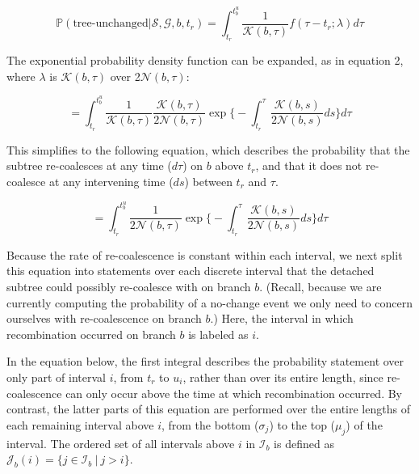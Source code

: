 \documentclass[11pt]{article}
\begin{document}
\begin{equation}
	\mathbb{P}(\textrm{tree-unchanged} | \mathcal{S}, \mathcal{G}, b, t_r) = 
	\int_{t_r}^{t_b^u} \frac{1}{\mathcal{K}(b,\tau)} f(\tau - t_r; \lambda) d\tau
\end{equation}

\noindent The exponential probability density function can be expanded, as in 
equation 2, where $\lambda$ is $\mathcal{K}(b,\tau)$ over 
2$\mathcal{N}(b,\tau)$:

\begin{equation}
	= \int_{t_r}^{t_b^u} 
	\frac{1}{\mathcal{K}(b,\tau)} 
	\frac{\mathcal{K}(b,\tau)}{2\mathcal{N}(b,\tau)}
	\exp \bigg\{
		-\int_{t_r}^{\tau} \frac{\mathcal{K}(b,s)}{2\mathcal{N}(b,s)}ds
		\bigg\} d\tau
\end{equation}

\noindent This simplifies to the following equation, which describes the probability that
the subtree re-coalesces at any time ($d\tau$) on $b$ above $t_r$, and 
that it does not re-coalesce at any intervening time ($ds$) between 
$t_r$ and $\tau$.

\begin{equation}
	= \int_{t_r}^{t_b^u}
	\frac{1}{2\mathcal{N}(b,\tau)}
	\exp \bigg\{
		-\int_{t_r}^{\tau} \frac{\mathcal{K}(b,s)}{2\mathcal{N}(b,s)}ds
		\bigg\} d\tau
\end{equation}

\noindent Because the rate of re-coalescence is constant within each interval, 
we next split this equation into statements over each discrete interval that the
detached subtree could possibly re-coalesce with on branch $b$. (Recall, because
we are currently computing the probability of a no-change event we only need
to concern ourselves with re-coalescence on branch $b$.)
Here, the interval in which recombination occurred on branch $b$ is labeled
as $i$. 

In the equation below, the first integral describes the probability statement
over only part of interval $i$, from $t_r$ to $u_i$, rather than over its entire 
length, since re-coalescence can only occur above the time at which recombination 
occurred. By contrast, the latter parts of this equation are performed over the
entire lengths of each remaining interval above $i$, from the 
bottom ($\sigma_j$) to the top ($\mu_j$) of the interval.
The ordered set of all intervals above $i$ in $\mathcal{I}_b$ 
is defined as $\mathcal{J}_b(i) = \{j \in \mathcal{I}_b ~|~ j > i \}$. 
\end{document}

